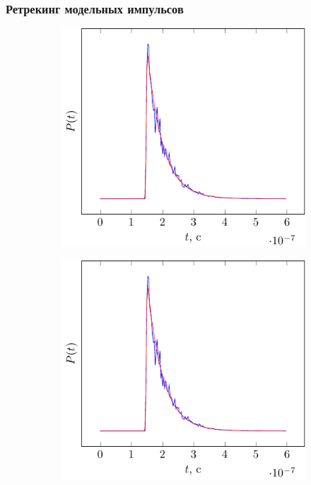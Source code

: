 \documentclass[10pt,pdf,hyperref={unicode}, dvipsnames]{beamer}
\begin{document}
\begin{frame}
\frametitle{Ретрекинг модельных импульсов}
\vskip -3pt
\begin{figure}
    \centering
    \begin{subfigure}{0.42\linewidth}
        \centering
        \includegraphics[width=1\linewidth,page=1]{fig/retracking/model}
    \end{subfigure}
    \begin{subfigure}{0.42\linewidth}
        \centering
        \includegraphics[width=1\linewidth,page=2]{fig/retracking/model}

\end{subfigure}
\end{figure}
\end{frame}
\end{document}
